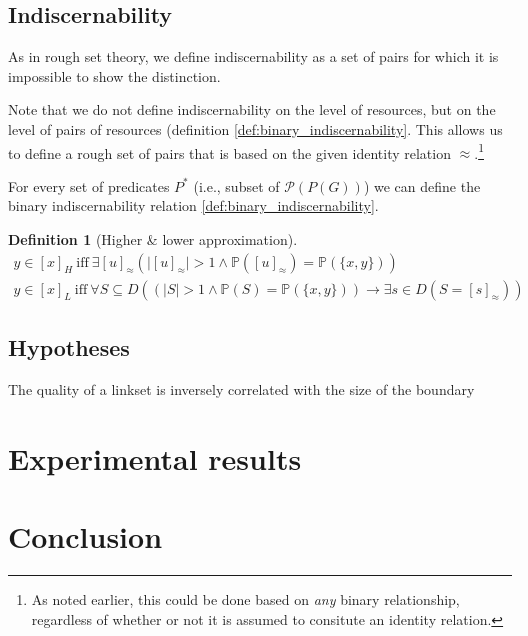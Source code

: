 \documentclass[letterpaper]{article}
\newtheorem{definition}{Definition}
\begin{document}
\subsection{Indiscernability}

As in rough set theory, we define indiscernability as a set of pairs for which it is impossible to show the distinction.

Note that we do not define indiscernability on the level of resources, but on the level of pairs of resources (definition \ref{def:binary_indiscernability}. This allows us to define a rough set of pairs that is based on the given identity relation $\approx$.\footnote{As noted earlier, this could be done based on \emph{any} binary relationship, regardless of whether or not it is assumed to consitute an identity relation.}

For every set of predicates $P^*$ (i.e., subset of $\mathcal{P}(P(G))$) we can define the binary indiscernability relation \ref{def:binary_indiscernability}.

\begin{definition}[Higher \& lower approximation]
\label{def:higher_lower_approximation}
\begin{align}
y \in [x]_H \  \text{iff} \  \exists [u]_{\approx} (
    \vert [u]_{\approx} \vert > 1
  \land
    \mathbb{P}([u]_{\approx}) = \mathbb{P}(\{ x, y \})
  ) \\
y \in [x]_L \  \text{iff} \  \forall S \subseteq D (
    (\vert S \vert > 1 \land \mathbb{P}(S) = \mathbb{P}(\{ x, y \}))
  \rightarrow
    \exists s \in D (S = [s]_{\approx})
  )
\end{align}
\end{definition}

\subsection{Hypotheses}

The quality of a linkset is inversely correlated with the size of the boundary

\section{Experimental results}

\section{Conclusion}
\end{document}
